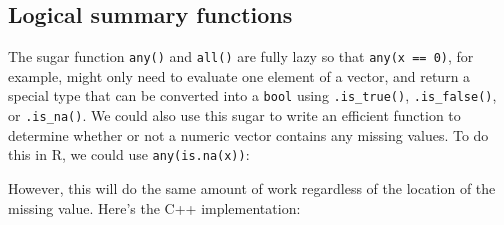 \subsection{Logical summary functions}

The sugar function \texttt{any()} and \texttt{all()} are fully lazy so
that \texttt{any(x == 0)}, for example, might only need to evaluate one
element of a vector, and return a special type that can be converted
into a \texttt{bool} using \texttt{.is\_true()}, \texttt{.is\_false()},
or \texttt{.is\_na()}. We could also use this sugar to write an
efficient function to determine whether or not a numeric vector contains
any missing values. To do this in R, we could use
\texttt{any(is.na(x))}:

\begin{Shaded}
\begin{Highlighting}[]
\StringTok{ }\NormalTok{(}
\end{Highlighting}
\end{Shaded}

However, this will do the same amount of work regardless of the location
of the missing value. Here's the C++ implementation:

\begin{Shaded}
\begin{Highlighting}[]
  

 
   
\NormalTok{\}}
\end{Highlighting}
\end{Shaded}

\begin{Shaded}
\begin{Highlighting}[]
\StringTok{ }\NormalTok{(}\NormalTok{)}
\StringTok{ }\NormalTok{)}
\StringTok{ }\NormalTok{(}

\NormalTok{(}
\NormalTok{)}
\end{Highlighting}
\end{Shaded}

